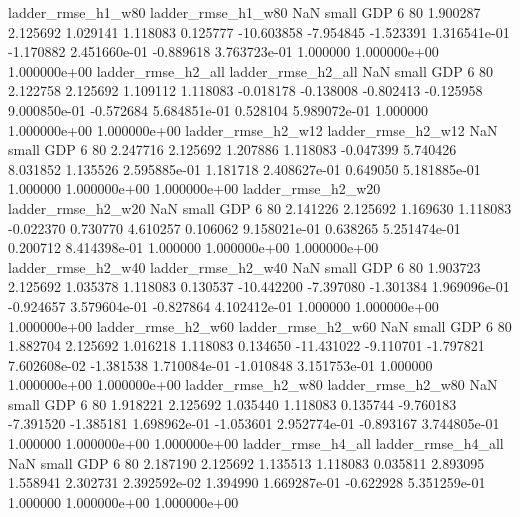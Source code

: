       ladder_rmse_h1_w80       ladder_rmse_h1_w80                   NaN      small      GDP                 6 80 1.900287       2.125692 1.029141       1.118083    0.125777    -10.603858     -7.954845    -1.523391   1.316541e-01 -1.170882 2.451660e-01    -0.889618   3.763723e-01            1.000000    1.000000e+00        1.000000e+00
      ladder_rmse_h2_all       ladder_rmse_h2_all                   NaN      small      GDP                 6 80 2.122758       2.125692 1.109112       1.118083   -0.018178     -0.138008     -0.802413    -0.125958   9.000850e-01 -0.572684 5.684851e-01     0.528104   5.989072e-01            1.000000    1.000000e+00        1.000000e+00
      ladder_rmse_h2_w12       ladder_rmse_h2_w12                   NaN      small      GDP                 6 80 2.247716       2.125692 1.207886       1.118083   -0.047399      5.740426      8.031852     1.135526   2.595885e-01  1.181718 2.408627e-01     0.649050   5.181885e-01            1.000000    1.000000e+00        1.000000e+00
      ladder_rmse_h2_w20       ladder_rmse_h2_w20                   NaN      small      GDP                 6 80 2.141226       2.125692 1.169630       1.118083   -0.022370      0.730770      4.610257     0.106062   9.158021e-01  0.638265 5.251474e-01     0.200712   8.414398e-01            1.000000    1.000000e+00        1.000000e+00
      ladder_rmse_h2_w40       ladder_rmse_h2_w40                   NaN      small      GDP                 6 80 1.903723       2.125692 1.035378       1.118083    0.130537    -10.442200     -7.397080    -1.301384   1.969096e-01 -0.924657 3.579604e-01    -0.827864   4.102412e-01            1.000000    1.000000e+00        1.000000e+00
      ladder_rmse_h2_w60       ladder_rmse_h2_w60                   NaN      small      GDP                 6 80 1.882704       2.125692 1.016218       1.118083    0.134650    -11.431022     -9.110701    -1.797821   7.602608e-02 -1.381538 1.710084e-01    -1.010848   3.151753e-01            1.000000    1.000000e+00        1.000000e+00
      ladder_rmse_h2_w80       ladder_rmse_h2_w80                   NaN      small      GDP                 6 80 1.918221       2.125692 1.035440       1.118083    0.135744     -9.760183     -7.391520    -1.385181   1.698962e-01 -1.053601 2.952774e-01    -0.893167   3.744805e-01            1.000000    1.000000e+00        1.000000e+00
      ladder_rmse_h4_all       ladder_rmse_h4_all                   NaN      small      GDP                 6 80 2.187190       2.125692 1.135513       1.118083    0.035811      2.893095      1.558941     2.302731   2.392592e-02  1.394990 1.669287e-01    -0.622928   5.351259e-01            1.000000    1.000000e+00        1.000000e+00

